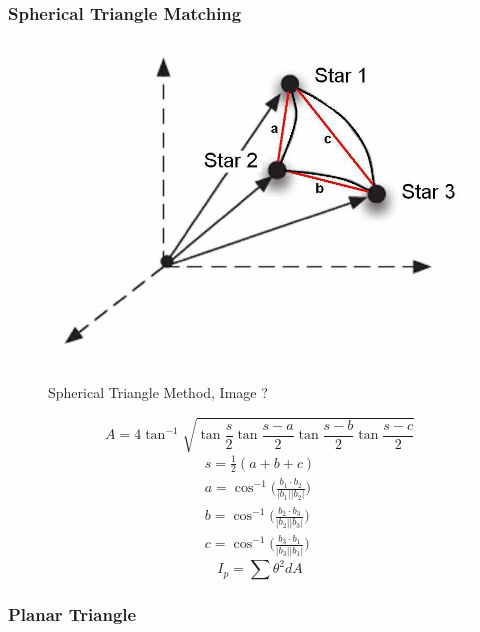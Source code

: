 \documentclass[12pt,a4paper,oneside]{article}
\begin{document}
\subsubsection{Spherical Triangle Matching}

\begin{figure}[h]
\includegraphics[scale=0.29]{spherical_triangle_method.jpg}
\centering
\label{fig:spherical_triangle_method}
\caption{Spherical Triangle Method, Image \cite{cole2004fast}?}
\end{figure}

\cite{cole2004fast}

\begin{equation}
A = 4\tan^{-1}\sqrt{\tan\frac{s}{2}\tan\frac{s-a}{2}\tan\frac{s-b}{2}\tan\frac{s-c}{2}}
\end{equation}
\begin{subequations}
\begin{align*}
s = \frac{1}{2}(a + b + c) \\
a = \cos^{-1} \bigg(\frac{b_1 \cdot b_2}{|b_1||b_2|}\bigg) \\
b = \cos^{-1} \bigg(\frac{b_2 \cdot b_3}{|b_2||b_3|}\bigg) \\
c = \cos^{-1} \bigg(\frac{b_3 \cdot b_1}{|b_3||b_1|}\bigg) 
\end{align*}
\end{subequations}
\begin{equation}
I_p = \sum\theta^2dA
\end{equation}
\subsubsection{Planar Triangle}
\end{document}
